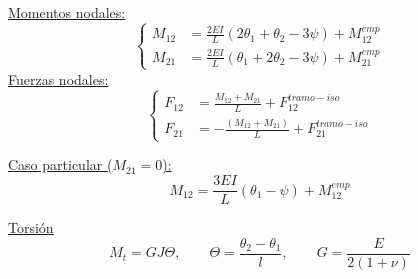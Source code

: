 \underline{Momentos nodales:}
$$
\left\{
\begin{array}{rl}
\displaystyle
M_{12} &=\frac{2 EI}{L} \left( 2 \theta_1  + \theta_2 - 3 \psi   \right)  +  M_{12}^{emp}  \\[3mm]
\displaystyle
M_{21} &=\frac{2 EI}{L} \left( \theta_1 + 2  \theta_2 - 3 \psi  \right)   +  M_{21}^{emp}
\end{array}
\right.
$$
\vspace{0.2cm}
\underline{Fuerzas nodales:}
$$
\left\{
\begin{array}{rl}
\displaystyle
F_{12} &= \frac{M_{12} + M_{21}}{L} + F_{12}^{tramo-iso} \\[3mm]
\displaystyle
F_{21} &= -\frac{(M_{12} + M_{21})}{L} + F_{21}^{tramo-iso} 
\end{array}
\right.
$$
%

\underline{Caso particular ($M_{21}=0$):}
$$
M_{12}=\frac{3EI}{L}\left( \theta_{1}-\psi \right) + M_{12}^{emp}
$$

\begin{center}
\end{center}

\underline{Torsión}
$$
M_t=GJ\Theta,
\qquad
\Theta=\frac{\theta_2 - \theta_1}{l},
\qquad
G=\frac{E}{2(1+\nu)}
$$


%
%
%	
%
%
%

